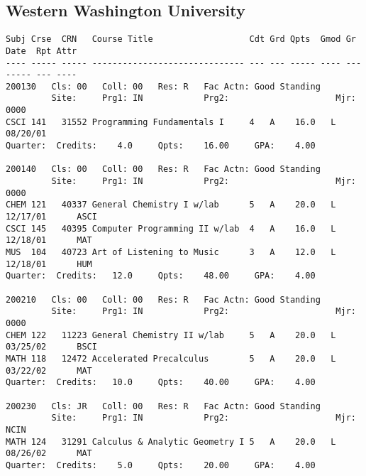 \documentclass[line]{res}
\begin{document}

\begin{resume}
\section{\sc Western Washington University}

\begin{verbatim}
Subj Crse  CRN   Course Title                   Cdt Grd Qpts  Gmod Gr Date  Rpt Attr
---- ----- ----- ------------------------------ --- --- ----- ---- -------- --- ----
200130   Cls: 00   Coll: 00   Res: R   Fac Actn: Good Standing    
         Site:     Prg1: IN            Prg2:                     Mjr: 0000
CSCI 141   31552 Programming Fundamentals I     4   A    16.0   L  08/20/01                          
Quarter:  Credits:    4.0     Qpts:    16.00     GPA:    4.00
                                                                                
200140   Cls: 00   Coll: 00   Res: R   Fac Actn: Good Standing    
         Site:     Prg1: IN            Prg2:                     Mjr: 0000
CHEM 121   40337 General Chemistry I w/lab      5   A    20.0   L  12/17/01      ASCI                
CSCI 145   40395 Computer Programming II w/lab  4   A    16.0   L  12/18/01      MAT                 
MUS  104   40723 Art of Listening to Music      3   A    12.0   L  12/18/01      HUM                 
Quarter:  Credits:   12.0     Qpts:    48.00     GPA:    4.00
                                                                                
200210   Cls: 00   Coll: 00   Res: R   Fac Actn: Good Standing    
         Site:     Prg1: IN            Prg2:                     Mjr: 0000
CHEM 122   11223 General Chemistry II w/lab     5   A    20.0   L  03/25/02      BSCI                
MATH 118   12472 Accelerated Precalculus        5   A    20.0   L  03/22/02      MAT                 
Quarter:  Credits:   10.0     Qpts:    40.00     GPA:    4.00
                                                                                
200230   Cls: JR   Coll: 00   Res: R   Fac Actn: Good Standing    
         Site:     Prg1: IN            Prg2:                     Mjr: NCIN
MATH 124   31291 Calculus & Analytic Geometry I 5   A    20.0   L  08/26/02      MAT                 
Quarter:  Credits:    5.0     Qpts:    20.00     GPA:    4.00
                                                                                

\end{verbatim}
\end{resume}
\end{document}
